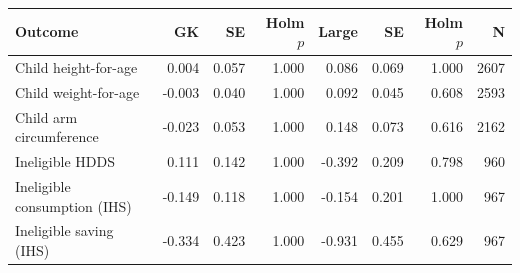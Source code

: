 \begin{tabular}{lrrrrrrr}
\toprule
Outcome & GK & SE & Holm $p$ & Large & SE & Holm $p$ & N \\
\midrule
Child height-for-age & 0.004 & 0.057 & 1.000 & 0.086 & 0.069 & 1.000 & 2607 \\
Child weight-for-age & -0.003 & 0.040 & 1.000 & 0.092 & 0.045 & 0.608 & 2593 \\
Child arm circumference & -0.023 & 0.053 & 1.000 & 0.148 & 0.073 & 0.616 & 2162 \\
Ineligible HDDS & 0.111 & 0.142 & 1.000 & -0.392 & 0.209 & 0.798 & 960 \\
Ineligible consumption (IHS) & -0.149 & 0.118 & 1.000 & -0.154 & 0.201 & 1.000 & 967 \\
Ineligible saving (IHS) & -0.334 & 0.423 & 1.000 & -0.931 & 0.455 & 0.629 & 967 \\
\bottomrule
\end{tabular}
